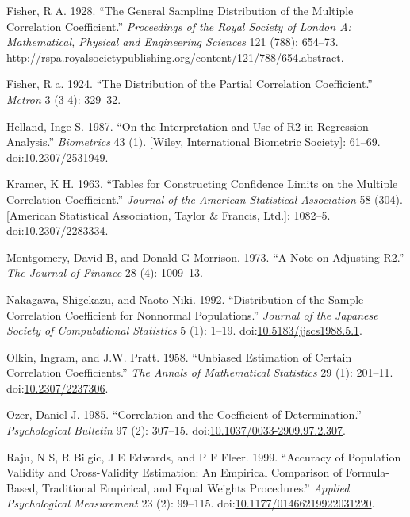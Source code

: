 \documentclass[]{article}
\begin{document}
\hypertarget{ref-Fisher1928}{}
Fisher, R A. 1928. ``The General Sampling Distribution of the Multiple
Correlation Coefficient.'' \emph{Proceedings of the Royal Society of
London A: Mathematical, Physical and Engineering Sciences} 121 (788):
654--73.
\url{http://rspa.royalsocietypublishing.org/content/121/788/654.abstract}.

\hypertarget{ref-Fisher1924}{}
Fisher, R a. 1924. ``The Distribution of the Partial Correlation
Coefficient.'' \emph{Metron} 3 (3-4): 329--32.

\hypertarget{ref-Helland1987}{}
Helland, Inge S. 1987. ``On the Interpretation and Use of R2 in
Regression Analysis.'' \emph{Biometrics} 43 (1). {[}Wiley, International
Biometric Society{]}: 61--69.
doi:\href{https://doi.org/10.2307/2531949}{10.2307/2531949}.

\hypertarget{ref-Kramer1963}{}
Kramer, K H. 1963. ``Tables for Constructing Confidence Limits on the
Multiple Correlation Coefficient.'' \emph{Journal of the American
Statistical Association} 58 (304). {[}American Statistical Association,
Taylor \& Francis, Ltd.{]}: 1082--5.
doi:\href{https://doi.org/10.2307/2283334}{10.2307/2283334}.

\hypertarget{ref-Montgomery1973}{}
Montgomery, David B, and Donald G Morrison. 1973. ``A Note on Adjusting
R2.'' \emph{The Journal of Finance} 28 (4): 1009--13.

\hypertarget{ref-Nakagawa1992}{}
Nakagawa, Shigekazu, and Naoto Niki. 1992. ``Distribution of the Sample
Correlation Coefficient for Nonnormal Populations.'' \emph{Journal of
the Japanese Society of Computational Statistics} 5 (1): 1--19.
doi:\href{https://doi.org/10.5183/jjscs1988.5.1}{10.5183/jjscs1988.5.1}.

\hypertarget{ref-Olkin1958}{}
Olkin, Ingram, and J.W. Pratt. 1958. ``Unbiased Estimation of Certain
Correlation Coefficients.'' \emph{The Annals of Mathematical Statistics}
29 (1): 201--11.
doi:\href{https://doi.org/10.2307/2237306}{10.2307/2237306}.

\hypertarget{ref-Ozer1985}{}
Ozer, Daniel J. 1985. ``Correlation and the Coefficient of
Determination.'' \emph{Psychological Bulletin} 97 (2): 307--15.
doi:\href{https://doi.org/10.1037/0033-2909.97.2.307}{10.1037/0033-2909.97.2.307}.

\hypertarget{ref-Raju1999}{}
Raju, N S, R Bilgic, J E Edwards, and P F Fleer. 1999. ``Accuracy of
Population Validity and Cross-Validity Estimation: An Empirical
Comparison of Formula-Based, Traditional Empirical, and Equal Weights
Procedures.'' \emph{Applied Psychological Measurement} 23 (2): 99--115.
doi:\href{https://doi.org/10.1177/01466219922031220}{10.1177/01466219922031220}.
\end{document}
